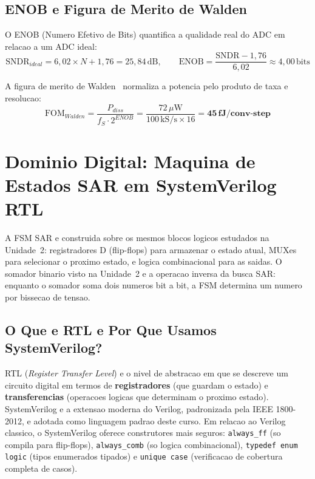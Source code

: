 \documentclass[12pt, a4paper]{article}
\begin{document}
\subsection{ENOB e Figura de Merito de Walden}

O ENOB (Numero Efetivo de Bits) quantifica a qualidade real do ADC em relacao a um ADC
ideal:
\begin{equation}
  \text{SNDR}_{ideal} = 6{,}02\times N + 1{,}76 = 25{,}84\,\text{dB}, \qquad
  \text{ENOB} = \frac{\text{SNDR}-1{,}76}{6{,}02} \approx 4{,}00\,\text{bits}
  \label{eq:enob}
\end{equation}

A figura de merito de Walden~\cite{walden1999} normaliza a potencia pelo produto de taxa e
resolucao:
\begin{equation}
  \text{FOM}_{Walden} = \frac{P_{diss}}{f_S \cdot 2^{ENOB}}
  = \frac{72\,\mu\text{W}}{100\,\text{kS/s} \times 16} = \mathbf{45\,\text{fJ/conv-step}}
  \label{eq:fom}
\end{equation}

\section{Dominio Digital: Maquina de Estados SAR em SystemVerilog RTL}

\begin{unidadebox}
A FSM SAR e construida sobre os mesmos blocos logicos estudados na Unidade~2: registradores
D (flip-flops) para armazenar o estado atual, MUXes para selecionar o proximo estado, e
logica combinacional para as saidas. O somador binario visto na Unidade~2 e a operacao
inversa da busca SAR: enquanto o somador soma dois numeros bit a bit, a FSM determina um
numero por bissecao de tensao.
\end{unidadebox}

\subsection{O Que e RTL e Por Que Usamos SystemVerilog?}

RTL (\textit{Register Transfer Level}) e o nivel de abstracao em que se descreve um circuito
digital em termos de \textbf{registradores} (que guardam o estado) e \textbf{transferencias}
(operacoes logicas que determinam o proximo estado). SystemVerilog e a extensao moderna do
Verilog, padronizada pela IEEE 1800-2012, e adotada como linguagem padrao deste curso.
Em relacao ao Verilog classico, o SystemVerilog oferece construtores mais seguros:
\texttt{always\_ff} (so compila para flip-flops), \texttt{always\_comb} (so logica combinacional),
\texttt{typedef enum logic} (tipos enumerados tipados) e \texttt{unique case} (verificacao de
cobertura completa de casos).
\end{document}
